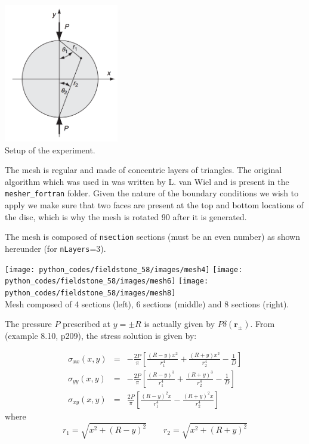 \begin{center}
\includegraphics[width=5cm]{python_codes/fieldstone_58/experiment1/setup}\\
{\captionfont Setup of the experiment.}
\end{center}

The mesh is regular and made of concentric layers of triangles. The original algorithm
which was used in \elefant was written by L. van Wiel and is present in the {\tt mesher\_fortran} folder.  
Given the nature of the boundary 
conditions we wish to apply we make sure that two faces are present at the top and bottom 
locations of the disc, which is why the mesh is rotated 90\degree 
after it is generated.  

The mesh is composed of {\tt nsection} sections (must be an even number)
as shown hereunder (for {\tt nLayers}=3). 
\begin{center}
\texttt{[image: python\_codes/fieldstone\_58/images/mesh4]}
\texttt{[image: python\_codes/fieldstone\_58/images/mesh6]}
\texttt{[image: python\_codes/fieldstone\_58/images/mesh8]}\\
{\captionfont Mesh composed of 4 sections (left), 6 sections (middle) and 8 sections (right).}
\end{center}

The pressure $P$ prescribed at $y=\pm R$ is actually given by $P \delta({\bm r_\pm})$. 
From \cite{sadd14} (example 8.10, p209), the stress solution is given by:

\begin{eqnarray}
\sigma_{xx}(x,y)&=& -\frac{2P}{\pi}\left[\frac{(R-y)x^2}{r_1^4} + \frac{(R+y)x^2}{r_2^4} -\frac{1}{D} \right] \\
\sigma_{yy}(x,y)&=& -\frac{2P}{\pi}\left[\frac{(R-y)^3}{r_1^4} + \frac{(R+y)^3}{r_2^4} -\frac{1}{D} \right] \\
\sigma_{xy}(x,y)&=&  \frac{2P}{\pi}\left[\frac{(R-y)^2 x}{r_1^4} - \frac{(R+y)^2x}{r_2^4}  \right]
\end{eqnarray}
where 
\[
r_1=\sqrt{x^2 + (R-y)^2}
\quad\quad
r_2=\sqrt{x^2 + (R+y)^2}
\]

